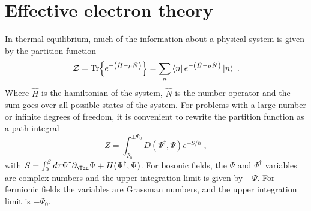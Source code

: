 \documentclass{article}
\begin{document}
\section{Effective electron theory}
In thermal equilibrium, much of the information about a physical system is given by the partition function 
\begin{equation}
    \mathcal{Z} = \Tr{e^{-\left(\hat{H} - \mu \hat{N}\right)}} = \sum_n \bra{n} e^{-\left(\hat{H} - \mu \hat{N}\right)} \ket{n} \;.
    \label{partion function}
\end{equation}
Where $\hat{H}$ is the hamiltonian of the system, $\hat{N}$ is the number operator and the sum goes over all possible states of the system. For problems with a large number or infinite degrees of freedom, it is convenient to rewrite the partition function as a path integral~\cite{Altland}
\begin{equation}
    Z = \int_{\Psi_0}^{\pm \Psi_0} D(\Psi^{\dagger},\Psi) e^{-S/\hbar}\;,
    \label{general path integral}
\end{equation}
with $S = \int_0^{\beta}d\tau \Psi^{\dagger}\partial_{\Tau}\Psi + H(\Psi^{\dagger},\Psi)$. For bosonic fields, the $\Psi$ and $\Psi^{\dagger}$ variables are complex numbers and the upper integration limit is given by $+\Psi$. For fermionic fields the variables are Grassman numbers, and the upper integration limit is $-\Psi_0$.
\end{document}
